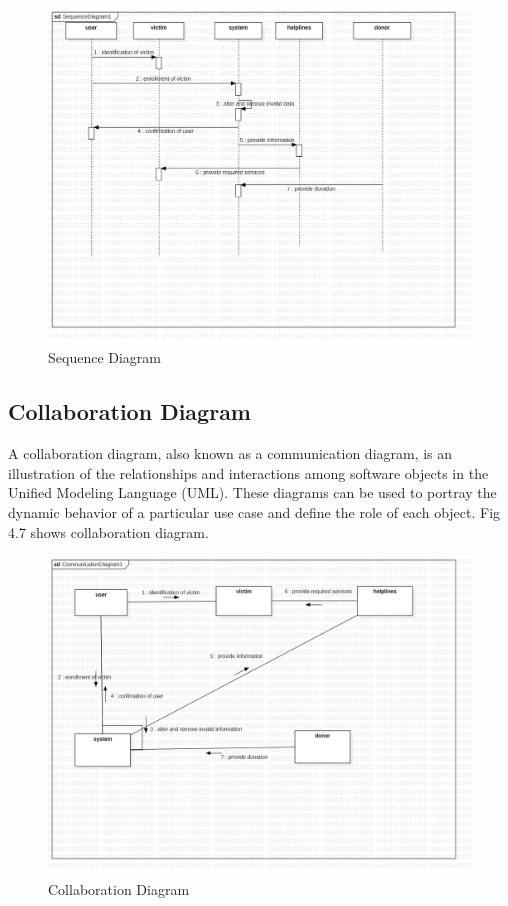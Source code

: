 \begin{figure}[H]
    \centering
    \includegraphics[scale=0.35]{design/SequenceDiagram.jpg}
    \caption{Sequence Diagram}
    \label{fig:my_label}
\end{figure}

\subsection{Collaboration Diagram}
A collaboration diagram, also known as a communication diagram, is an illustration of the relationships and interactions among software objects in the Unified Modeling Language (UML). These diagrams can be used to portray the dynamic behavior of a particular use case and define the role of each object. Fig 4.7 shows collaboration diagram.
\begin{figure}[H]
    \centering
    \includegraphics[scale=0.30]{design/CommunicationDiagram.jpg}
    \caption{Collaboration Diagram}
    \label{fig:my_label}
\end{figure}

